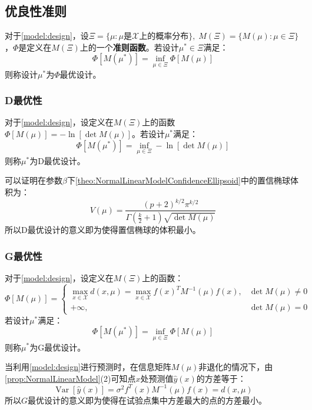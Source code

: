 \subsection{优良性准则}
\begin{definition}
	对于\cref{model:design}，设$\Xi=\{\mu:\mu\text{是$\mathcal{X}$上的概率分布}\},\;M(\Xi)=\{M(\mu):\mu\in\Xi\}$，$\Phi$是定义在$M(\Xi)$上的一个\textbf{准则函数}。若设计$\mu^*\in\Xi$满足：
	\begin{equation*}
		\Phi[M(\mu^*)]=\inf_{\mu\in\Xi}\Phi[M(\mu)]
	\end{equation*}
	则称设计$\mu^*$为$\Phi$最优设计。
\end{definition}
\subsubsection{D最优性}
\begin{definition}
	对于\cref{model:design}，设定义在$M(\Xi)$上的函数$\Phi[M(\mu)]=-\ln[\det M(\mu)]$。若设计$\mu^*$满足：
	\begin{equation*}
		\Phi[M(\mu^*)]=\inf_{\mu\in\Xi}-\ln[\det M(\mu)]
	\end{equation*}
	则称$\mu^*$为D最优设计。
\end{definition}
\begin{note}
	可以证明在参数$\beta$下\cref{theo:NormalLinearModelConfidenceEllipsoid}中的置信椭球体积为：
	\begin{equation*}
		V(\mu)=\frac{(p+2)^{k/2}\pi^{k/2}}{\Gamma\left(\frac{k}{2}+1\right)\sqrt{\det M(\mu)}}
	\end{equation*}
	所以D最优设计的意义即为使得置信椭球的体积最小。
\end{note}
\subsubsection{G最优性}
\begin{definition}
	对于\cref{model:design}，设定义在$M(\Xi)$上的函数：
	\begin{equation*}
		\Phi[M(\mu)]=
		\begin{cases}
			\max\limits_{x\in\mathcal{X}}d(x,\mu)=\max\limits_{x\in\mathcal{X}}f(x)^TM^{-1}(\mu)f(x),&\det M(\mu)\ne0 \\
			+\infty,&\det M(\mu)=0
		\end{cases}
	\end{equation*}
	若设计$\mu^*$满足：
	\begin{equation*}
		\Phi[M(\mu^*)]=\inf_{\mu\in\Xi}\Phi[M(\mu)]
	\end{equation*}
	则称$\mu^*$为G最优设计。
\end{definition}
\begin{note}
	当利用\cref{model:design}进行预测时，在信息矩阵$M(\mu)$非退化的情况下，由\cref{prop:NormalLinearModel}(2)可知点$x$处预测值$\hat{y}(x)$的方差等于：
	\begin{equation*}
		\operatorname{Var}[\hat{y}(x)]=\sigma^2f^T(x)M^{-1}(\mu)f(x)=d(x,\mu)
	\end{equation*}
	所以$G$最优设计的意义即为使得在试验点集中方差最大的点的方差最小。
\end{note}
